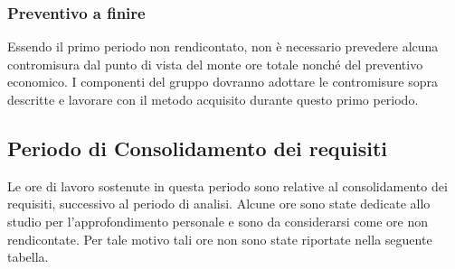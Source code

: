 \subsubsection{Preventivo a finire} 
Essendo il primo periodo non rendicontato, non è necessario prevedere alcuna contromisura dal punto di vista del monte ore totale nonché del preventivo economico. I componenti del gruppo dovranno adottare le contromisure sopra descritte e lavorare con il metodo acquisito durante questo primo periodo.

\subsection{Periodo di Consolidamento dei requisiti}
Le ore di lavoro sostenute in questa periodo sono relative al consolidamento dei requisiti, successivo al periodo di analisi. Alcune ore sono state dedicate allo studio per l'approfondimento personale e sono da considerarsi come ore non rendicontate. Per tale motivo tali ore non sono state riportate nella seguente tabella.

